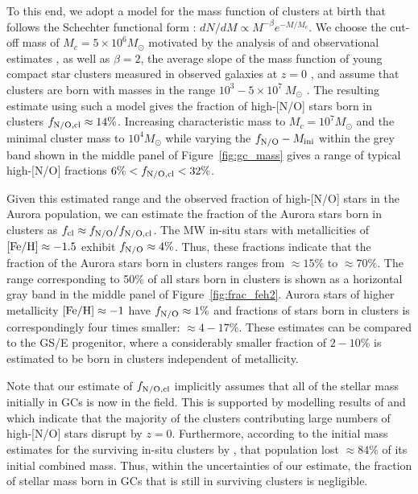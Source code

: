 \documentclass[a4paper,useAMS,usenatbib]{mnras}
\begin{document}
To this end, we adopt a model for the mass function of clusters at birth that follows the Schechter functional form \citep[][]{Schechter1976}: $dN/dM \propto M^{-\beta} e^{-M/M_c}$.  
We choose the cut-off mass of $M_c=5\times10^6 M_{\odot}$ motivated by the analysis of \citet{Choksi2019} and observational estimates \citep[see Fig. 17 in][]{Adamo.etal.2020}, as well as  $\beta=2$, the average slope of the mass function of young compact star clusters measured in observed galaxies at $z=0$ \citep[see][for a review]{Krumholz2019}, and assume that clusters are born with masses in the range $10^3-5\times10^7\ M_{\odot}$ \citep[see, e.g.,][for an observational justification of the upper value]{Norris.etal.2019}. The resulting estimate using such a model gives the fraction of high-[N/O] stars born in clusters  $f_{\rm N/O,cl}\approx14\%$. Increasing characteristic mass to $M_c=10^7M_{\odot}$ and the minimal cluster mass to $10^4M_{\odot}$ while varying the $f_{\rm N/O}-M_{\rm ini}$ within the grey band shown in the middle panel of Figure~\ref{fig:gc_mass} gives a range of typical high-[N/O] fractions $6\%<f_{\rm N/O,cl}<32\%$. 

Given this estimated range and the observed fraction of high-[N/O] stars in the Aurora population, we can estimate the fraction of the Aurora stars born in clusters as $f_{\rm cl}\approx f_{\rm N/O}/f_{\rm N/O,cl}$. The MW in-situ stars with metallicities of $\rm [Fe/H]\approx -1.5$ exhibit $f_{\rm N/O}\approx 4\%$.
Thus, these fractions indicate that the fraction of the Aurora stars born in clusters ranges from $\approx 15\%$ to $\approx 70\%$. 
The range corresponding to 50\% of all stars born in clusters is shown as a horizontal gray band in the middle panel of Figure~\ref{fig:frac_feh2}.   
Aurora stars of higher metallicity $\rm [Fe/H]\approx -1$ have $f_{\rm N/O}\approx 1\%$ and fractions of stars born in clusters is correspondingly four times smaller: $\approx 4-17\%$. These estimates can be compared to the GS/E progenitor, where a considerably smaller fraction of $2-10\%$ is estimated to be born in clusters independent of metallicity. 

Note that our estimate of $f_{\rm N/O,cl}$ implicitly assumes that all of the stellar mass initially in GCs is now in the field. 
This is supported by modelling results of \citet[][see their Fig. 3]{Rodriguez2023} and \citet[][see their Fig. 13]{Gieles2023} which indicate that the majority of the clusters contributing large numbers of high-[N/O] stars disrupt by $z=0$. Furthermore, according to the initial mass estimates for the surviving in-situ clusters by \citet{Baumgardt2003}, that population lost $\approx 84\%$ of its initial combined mass. Thus, within the uncertainties of our estimate, the fraction of stellar mass born in GCs that is still in surviving clusters is negligible.  
\end{document}
